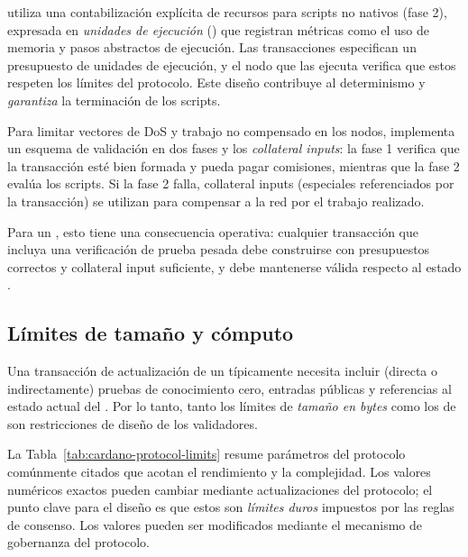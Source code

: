\Cardano utiliza una contabilización explícita de recursos para scripts no nativos (fase 2), expresada en \emph{unidades de ejecución} (\ExUnits) que registran métricas como el uso de memoria y pasos abstractos de ejecución. Las transacciones especifican un presupuesto de unidades de ejecución, y el nodo que las ejecuta verifica que estos respeten los límites del protocolo. Este diseño contribuye al determinismo y \emph{garantiza} la terminación de los scripts.

Para limitar vectores de DoS y trabajo no compensado en los nodos, \Cardano implementa un esquema de validación en dos fases y los \emph{collateral inputs}: la fase 1 verifica que la transacción esté bien formada y pueda pagar comisiones, mientras que la fase 2 evalúa los scripts. Si la fase 2 falla, collateral inputs (\UTxOs especiales referenciados por la transacción) se utilizan para compensar a la red por el trabajo realizado.

Para un \zkBridge, esto tiene una consecuencia operativa: cualquier transacción que incluya una verificación de prueba pesada debe construirse con presupuestos correctos y collateral input suficiente, y debe mantenerse válida respecto al estado \Onchain.

\subsection{Límites de tamaño y cómputo}

Una transacción de actualización de un \zkBridge típicamente necesita incluir (directa o indirectamente) pruebas de conocimiento cero, entradas públicas y referencias al estado actual del \Bridge. Por lo tanto, tanto los límites de \emph{tamaño en bytes} como los de \ExUnits son restricciones de diseño de los validadores.

La Tabla~\ref{tab:cardano-protocol-limits} resume parámetros del protocolo comúnmente citados que acotan el rendimiento y la complejidad. Los valores numéricos exactos pueden cambiar mediante actualizaciones del protocolo; el punto clave para el diseño es que estos son \emph{límites duros} impuestos por las reglas de consenso. Los valores pueden ser modificados mediante el mecanismo de gobernanza del protocolo.

